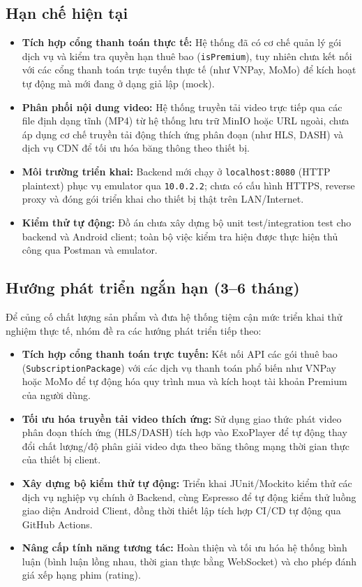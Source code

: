 \subsection{Hạn chế hiện tại}
\begin{itemize}
    \item \textbf{Tích hợp cổng thanh toán thực tế:} Hệ thống đã có cơ chế quản lý gói dịch vụ và kiểm tra quyền hạn thuê bao (\texttt{isPremium}), tuy nhiên chưa kết nối với các cổng thanh toán trực tuyến thực tế (như VNPay, MoMo) để kích hoạt tự động mà mới đang ở dạng giả lập (mock).
    \item \textbf{Phân phối nội dung video:} Hệ thống truyền tải video trực tiếp qua các file định dạng tĩnh (MP4) từ hệ thống lưu trữ MinIO hoặc URL ngoài, chưa áp dụng cơ chế truyền tải động thích ứng phân đoạn (như HLS, DASH) và dịch vụ CDN để tối ưu hóa băng thông theo thiết bị.
    \item \textbf{Môi trường triển khai:} Backend mới chạy ở \texttt{localhost:8080} (HTTP plaintext) phục vụ emulator qua \texttt{10.0.2.2}; chưa có cấu hình HTTPS, reverse proxy và đóng gói triển khai cho thiết bị thật trên LAN/Internet.
    \item \textbf{Kiểm thử tự động:} Đồ án chưa xây dựng bộ unit test/integration test cho backend và Android client; toàn bộ việc kiểm tra hiện được thực hiện thủ công qua Postman và emulator.
\end{itemize}

\subsection{Hướng phát triển ngắn hạn (3--6 tháng)}
Để củng cố chất lượng sản phẩm và đưa hệ thống tiệm cận mức triển khai thử nghiệm thực tế, nhóm đề ra các hướng phát triển tiếp theo:
\begin{itemize}
    \item \textbf{Tích hợp cổng thanh toán trực tuyến:} Kết nối API các gói thuê bao (\texttt{SubscriptionPackage}) với các dịch vụ thanh toán phổ biến như VNPay hoặc MoMo để tự động hóa quy trình mua và kích hoạt tài khoản Premium của người dùng.
    \item \textbf{Tối ưu hóa truyền tải video thích ứng:} Sử dụng giao thức phát video phân đoạn thích ứng (HLS/DASH) tích hợp vào ExoPlayer để tự động thay đổi chất lượng/độ phân giải video dựa theo băng thông mạng thời gian thực của thiết bị client.
    \item \textbf{Xây dựng bộ kiểm thử tự động:} Triển khai JUnit/Mockito kiểm thử các dịch vụ nghiệp vụ chính ở Backend, cùng Espresso để tự động kiểm thử luồng giao diện Android Client, đồng thời thiết lập tích hợp CI/CD tự động qua GitHub Actions.
    \item \textbf{Nâng cấp tính năng tương tác:} Hoàn thiện và tối ưu hóa hệ thống bình luận (bình luận lồng nhau, thời gian thực bằng WebSocket) và cho phép đánh giá xếp hạng phim (rating).
\end{itemize}

